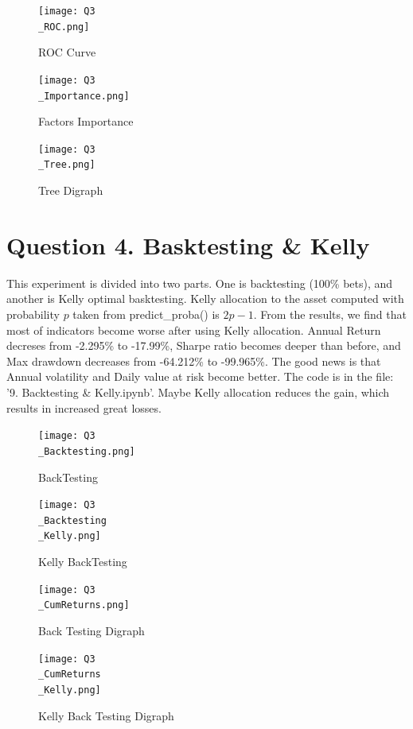 \documentclass[UTF8]{ctexart}
\begin{document}
\begin{figure}[H]
	\centerline{\texttt{[image: Q3\\\_ROC.png]}}
	\caption{ROC Curve}
\end{figure}

\begin{figure}[H]
	\centerline{\texttt{[image: Q3\\\_Importance.png]}}
	\caption{Factors Importance}
\end{figure}

\begin{figure}[H]
	\centerline{\texttt{[image: Q3\\\_Tree.png]}}
	\caption{Tree Digraph}
\end{figure}

\section*{Question 4. Basktesting \& Kelly}

This experiment is divided into two parts. One is backtesting (100\% bets), and another is Kelly optimal basktesting. Kelly allocation to the asset computed with probability $p$ taken from predict\_proba() is $2p-1$. From the results, we find that most of indicators become worse after using Kelly allocation. Annual Return decreses from -2.295\% to -17.99\%, Sharpe ratio becomes deeper than before, and Max drawdown decreases from -64.212\% to -99.965\%. The good news is that Annual volatility and Daily value at risk become better. The code is in the file: '9. Backtesting \& Kelly.ipynb'. Maybe Kelly allocation reduces the gain, which results in increased great losses.

\begin{figure}[H]
	\centering
	\begin{minipage}[t]{0.4\textwidth}
		\centering
		\centerline{\texttt{[image: Q3\\\_Backtesting.png]}}
		\caption{BackTesting}
	\end{minipage}
	\hfill
	\begin{minipage}[t]{0.4\textwidth}
		\centering
		\centerline{\texttt{[image: Q3\\\_Backtesting\\\_Kelly.png]}}
		\caption{Kelly BackTesting}
	\end{minipage}
\end{figure}

\begin{figure}[H]
	\centerline{\texttt{[image: Q3\\\_CumReturns.png]}}
	\caption{Back Testing Digraph}
\end{figure}

\begin{figure}[H]
	\centerline{\texttt{[image: Q3\\\_CumReturns\\\_Kelly.png]}}
	\caption{Kelly Back Testing Digraph}
\end{figure}
\end{document}
